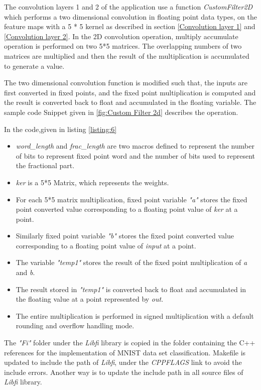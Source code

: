 \vspace{0.25cm}
The convolution layers 1 and 2 of the application use a function \textit{CustomFilter2D} which performs a two dimensional convolution in floating point data types, on the feature maps with a 5 * 5 kernel as described in section \ref{Convolution layer 1} and \ref{Convolution layer 2}. In the 2D convolution operation, multiply accumulate operation is performed on two 5*5 matrices. The overlapping numbers of two matrices are multiplied and then the result of the multiplication is accumulated to generate a value.

\vspace{0.25cm}
The two dimensional convolution function is modified such that, the inputs are first converted in fixed points, and the fixed point multiplication is computed and the result is converted back to float and accumulated in the floating variable. The sample code Snippet given in \ref{fig:Custom Filter 2d} describes the operation.


\vspace{0.25cm}
In the code,given in listing \ref{listing:6}
\begin{itemize}
\item
\textit{word\_length} and \textit{frac\_length} are two macros defined to represent the number of bits to represent fixed point word and the number of bits used to represent the fractional part.
\item
\textit{ker} is a 5*5 Matrix, which represents the weights.
\item
For each 5*5 matrix multiplication, fixed point variable \textit{"a"} stores the fixed point converted value corresponding to a floating point value of \textit{ker} at a point.
\item
Similarly fixed point variable \textit{"b"} stores the fixed point converted value corresponding to a floating point value of \textit{input} at a point.
\item
The variable \textit{"temp1"} stores the result of the fixed point multiplication of \textit{a} and \textit{b}.
\item 
The result stored in \textit{"temp1"} is converted back to float and accumulated in the floating value at a point represented by \textit{out}.
\item 
The entire multiplication is performed in signed multiplication with a default rounding and overflow handling mode.
\end{itemize}
\noindent The \textit{"Fi"} folder under the \textit{Libfi} library is copied in the folder containing the C++ references for the implementation of MNIST data set classification. Makefile is updated to include the path of \textit{Libfi}, under the \textit{CPPFLAGS} link to avoid the include errors. Another way is to update the include path in all source files of \textit{Libfi} library.


